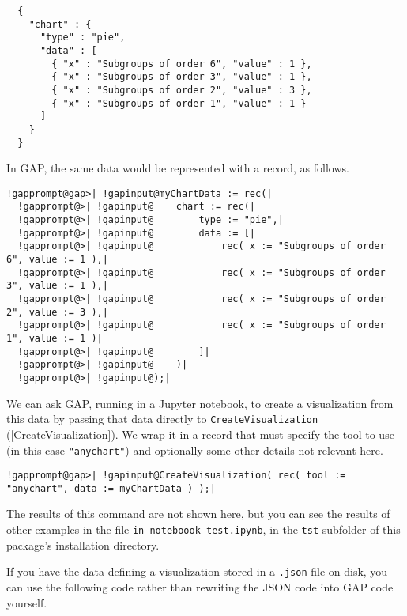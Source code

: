 \documentclass[a4paper,11pt]{report}
\begin{document}
{{{ 
\begin{verbatim}  
  {
    "chart" : {
      "type" : "pie",
      "data" : [
        { "x" : "Subgroups of order 6", "value" : 1 },
        { "x" : "Subgroups of order 3", "value" : 1 },
        { "x" : "Subgroups of order 2", "value" : 3 },
        { "x" : "Subgroups of order 1", "value" : 1 }
      ]
    }
  }
\end{verbatim}
 

 In \textsf{GAP}, the same data would be represented with a record, as follows. 

 
\begin{Verbatim}[commandchars=!@|,fontsize=\small,frame=single,label=Example]
  !gapprompt@gap>| !gapinput@myChartData := rec(|
  !gapprompt@>| !gapinput@    chart := rec(|
  !gapprompt@>| !gapinput@        type := "pie",|
  !gapprompt@>| !gapinput@        data := [|
  !gapprompt@>| !gapinput@            rec( x := "Subgroups of order 6", value := 1 ),|
  !gapprompt@>| !gapinput@            rec( x := "Subgroups of order 3", value := 1 ),|
  !gapprompt@>| !gapinput@            rec( x := "Subgroups of order 2", value := 3 ),|
  !gapprompt@>| !gapinput@            rec( x := "Subgroups of order 1", value := 1 )|
  !gapprompt@>| !gapinput@        ]|
  !gapprompt@>| !gapinput@    )|
  !gapprompt@>| !gapinput@);|
\end{Verbatim}
 

 We can ask \textsf{GAP}, running in a Jupyter notebook, to create a visualization from this data by
passing that data directly to \texttt{CreateVisualization} (\ref{CreateVisualization}). We wrap it in a record that must specify the tool to use (in this case \texttt{"anychart"}) and optionally some other details not relevant here. 

 
\begin{Verbatim}[commandchars=!@|,fontsize=\small,frame=single,label=Example]
  !gapprompt@gap>| !gapinput@CreateVisualization( rec( tool := "anychart", data := myChartData ) );|
\end{Verbatim}
 

 The results of this command are not shown here, but you can see the results of
other examples in the file \texttt{in-noteboook-test.ipynb}, in the \texttt{tst} subfolder of this package's installation directory. 

 If you have the data defining a visualization stored in a \texttt{.json} file on disk, you can use the following code rather than rewriting the JSON
code into \textsf{GAP} code yourself. 

}}}
\end{document}
